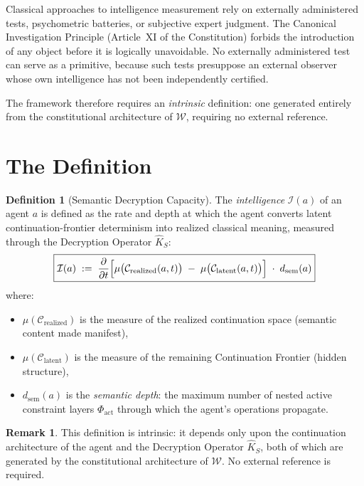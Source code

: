 \documentclass[12pt,anyside]{book}
\theoremstyle{plain}
\theoremstyle{definition}
\newtheorem{definition}{Definition}[chapter]
\newtheorem{remark}{Remark}[chapter]
\newcommand{\W}{\mathcal{W}}          %
\newcommand{\Khat}{\hat{K}_S}          %
\newcommand{\Ical}{\mathcal{I}}        %
\begin{document}
Classical approaches to intelligence measurement rely on externally administered tests, psychometric batteries, or subjective expert judgment. The Canonical Investigation Principle (Article~XI of the Constitution) forbids the introduction of any object before it is logically unavoidable. No externally administered test can serve as a primitive, because such tests presuppose an external observer whose own intelligence has not been independently certified.

The framework therefore requires an \emph{intrinsic} definition: one generated entirely from the constitutional architecture of $\W$, requiring no external reference.

\section{The Definition}

\begin{definition}[Semantic Decryption Capacity]\label{def:intel}
The \emph{intelligence} $\Ical(a)$ of an agent $a$ is defined as the rate and depth at which the agent converts latent continuation-frontier determinism into realized classical meaning, measured through the Decryption Operator $\Khat$:
\[
\boxed{
\Ical(a) \;:=\;
\frac{\partial}{\partial t}
\Bigl[
\mu\bigl(\mathcal{C}_{\mathrm{realized}}(a,t)\bigr)
\;-\;
\mu\bigl(\mathcal{C}_{\mathrm{latent}}(a,t)\bigr)
\Bigr]
\;\cdot\;
d_{\mathrm{sem}}(a)
}
\]
where:
\begin{itemize}
\item $\mu(\mathcal{C}_{\mathrm{realized}})$ is the measure of the realized continuation space (semantic content made manifest),
\item $\mu(\mathcal{C}_{\mathrm{latent}})$ is the measure of the remaining Continuation Frontier (hidden structure),
\item $d_{\mathrm{sem}}(a)$ is the \emph{semantic depth}: the maximum number of nested active constraint layers $\Phi_{\mathrm{act}}$ through which the agent's operations propagate.
\end{itemize}
\end{definition}

\begin{remark}
This definition is intrinsic: it depends only upon the continuation architecture of the agent and the Decryption Operator $\Khat$, both of which are generated by the constitutional architecture of $\W$. No external reference is required.
\end{remark}
\end{document}
